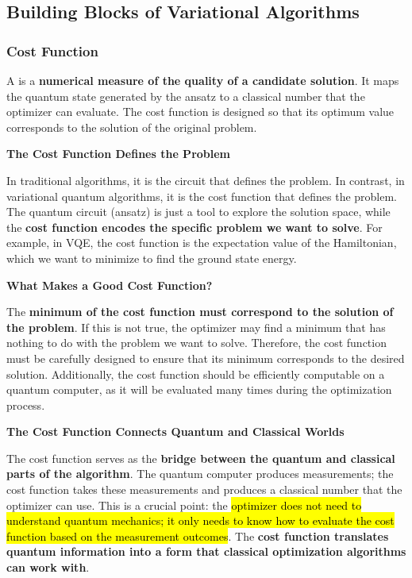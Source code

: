 \subsection{Building Blocks of Variational Algorithms}\label{sec:building-blocks-of-variational-algorithms}

\subsubsection{Cost Function}\label{sec:cost-function}

A  is a \textbf{numerical measure of the quality of a candidate solution}. It maps the quantum state generated by the ansatz to a classical number that the optimizer can evaluate. The cost function is designed so that its optimum value corresponds to the solution of the original problem.

\highspace
\begin{flushleft}
    \textcolor{Green3}{ \textbf{The Cost Function Defines the Problem}}
\end{flushleft}
In traditional algorithms, it is the circuit that defines the problem. In contrast, in variational quantum algorithms, it is the cost function that defines the problem. The quantum circuit (ansatz) is just a tool to explore the solution space, while the \textbf{cost function encodes the specific problem we want to solve}. For example, in VQE, the cost function is the expectation value of the Hamiltonian, which we want to minimize to find the ground state energy.

\highspace
\begin{flushleft}
    \textcolor{Green3}{ \textbf{What Makes a Good Cost Function?}}
\end{flushleft}
The \textbf{minimum of the cost function must correspond to the solution of the problem}. If this is not true, the optimizer may find a minimum that has nothing to do with the problem we want to solve. Therefore, the cost function must be carefully designed to ensure that its minimum corresponds to the desired solution. Additionally, the cost function should be efficiently computable on a quantum computer, as it will be evaluated many times during the optimization process.

\highspace
\begin{flushleft}
    \textcolor{Green3}{ \textbf{The Cost Function Connects Quantum and Classical Worlds}}
\end{flushleft}
The cost function serves as the \textbf{bridge between the quantum and classical parts of the algorithm}. The quantum computer produces measurements; the cost function takes these measurements and produces a classical number that the optimizer can use. This is a crucial point: the \hl{optimizer does not need to understand quantum mechanics; it only needs to know how to evaluate the cost function based on the measurement outcomes}. The \textbf{cost function translates quantum information into a form that classical optimization algorithms can work with}.

